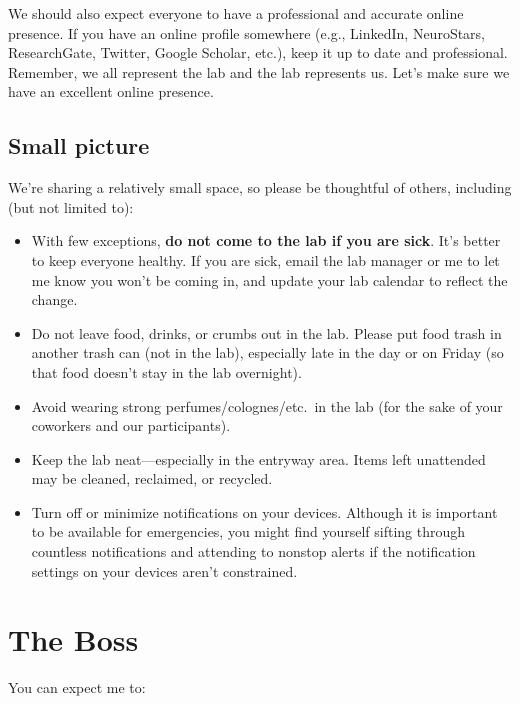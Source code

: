 \documentclass[letterpaper,12pt,oneside]{memoir}
\begin{document}
We should also expect everyone to have a professional and accurate online presence. If you have an online profile somewhere (e.g., LinkedIn, NeuroStars, ResearchGate, Twitter, Google Scholar, etc.), keep it up to date and professional. Remember, we all represent the lab and the lab represents us. Let's make sure we have an excellent online presence.


\subsection{Small picture}

We're sharing a relatively small space, so please be thoughtful of others, including (but not limited to):

\begin{itemize}
\item With few exceptions, \textbf{do not come to the lab if you are sick}. It's better to keep everyone healthy. If you are sick, email the lab manager or me to let me know you won't be coming in, and update your lab calendar to reflect the change.
\item Do not leave food, drinks, or crumbs out in the lab. Please put food trash in another trash can (not in the lab), especially late in the day or on Friday (so that food doesn't stay in the lab overnight).
\item Avoid wearing strong perfumes/colognes/etc.\ in the lab (for the sake of your coworkers and our participants).
\item Keep the lab neat---especially in the entryway area. Items left unattended may be cleaned, reclaimed, or recycled.
\item Turn off or minimize notifications on your devices. Although it is important to be available for emergencies, you might find yourself sifting through countless notifications and attending to nonstop alerts if the notification settings on your devices aren't constrained.
\end{itemize}


\section{The Boss}

You can expect me to:
\end{document}
